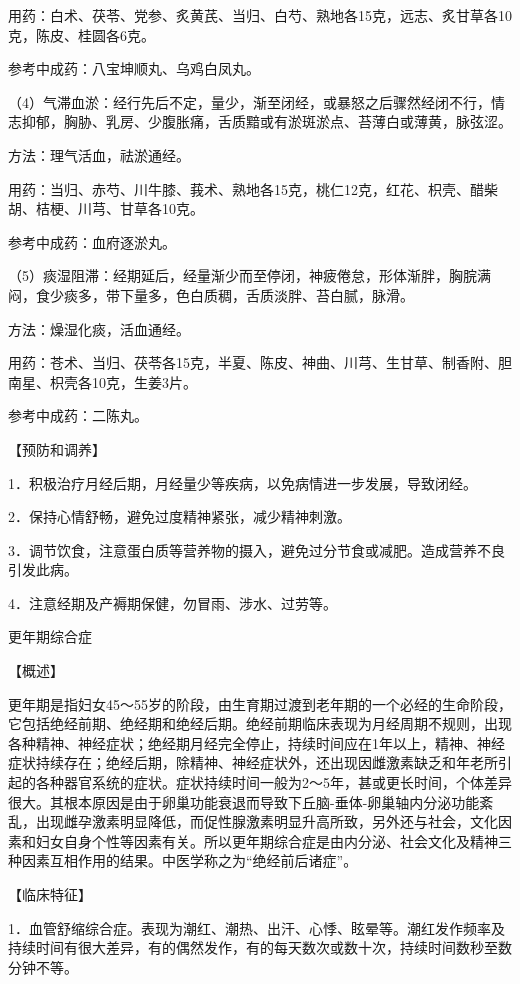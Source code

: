 \documentclass[12pt,UTF8]{ctexbook}
\begin{document}
用药：白术、茯苓、党参、炙黄芪、当归、白芍、熟地各15克，远志、炙甘草各10克，陈皮、桂圆各6克。

参考中成药：八宝坤顺丸、乌鸡白凤丸。

（4）气滞血淤：经行先后不定，量少，渐至闭经，或暴怒之后骤然经闭不行，情志抑郁，胸胁、乳房、少腹胀痛，舌质黯或有淤斑淤点、苔薄白或薄黄，脉弦涩。

方法：理气活血，祛淤通经。

用药：当归、赤芍、川牛膝、莪术、熟地各15克，桃仁12克，红花、枳壳、醋柴胡、桔梗、川芎、甘草各10克。

参考中成药：血府逐淤丸。

（5）痰湿阻滞：经期延后，经量渐少而至停闭，神疲倦怠，形体渐胖，胸脘满闷，食少痰多，带下量多，色白质稠，舌质淡胖、苔白腻，脉滑。

方法：燥湿化痰，活血通经。

用药：苍术、当归、茯苓各15克，半夏、陈皮、神曲、川芎、生甘草、制香附、胆南星、枳壳各10克，生姜3片。

参考中成药：二陈丸。

【预防和调养】

1．积极治疗月经后期，月经量少等疾病，以免病情进一步发展，导致闭经。

2．保持心情舒畅，避免过度精神紧张，减少精神刺激。

3．调节饮食，注意蛋白质等营养物的摄入，避免过分节食或减肥。造成营养不良引发此病。

4．注意经期及产褥期保健，勿冒雨、涉水、过劳等。





更年期综合症


【概述】

更年期是指妇女45～55岁的阶段，由生育期过渡到老年期的一个必经的生命阶段，它包括绝经前期、绝经期和绝经后期。绝经前期临床表现为月经周期不规则，出现各种精神、神经症状；绝经期月经完全停止，持续时间应在1年以上，精神、神经症状持续存在；绝经后期，除精神、神经症状外，还出现因雌激素缺乏和年老所引起的各种器官系统的症状。症状持续时间一般为2～5年，甚或更长时间，个体差异很大。其根本原因是由于卵巢功能衰退而导致下丘脑-垂体-卵巢轴内分泌功能紊乱，出现雌孕激素明显降低，而促性腺激素明显升高所致，另外还与社会，文化因素和妇女自身个性等因素有关。所以更年期综合症是由内分泌、社会文化及精神三种因素互相作用的结果。中医学称之为“绝经前后诸症”。

【临床特征】

1．血管舒缩综合症。表现为潮红、潮热、出汗、心悸、眩晕等。潮红发作频率及持续时间有很大差异，有的偶然发作，有的每天数次或数十次，持续时间数秒至数分钟不等。
\end{document}
